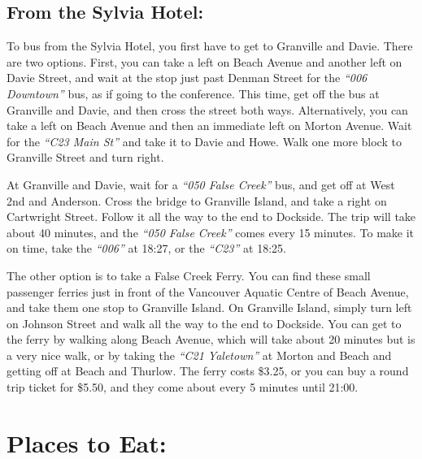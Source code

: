 \documentclass[letterpaper,12pt]{article}
\newcommand{\bus}[1]{\textit{``#1''}}
\begin{document}
\subsection*{From the Sylvia Hotel:}

To bus from the Sylvia Hotel, you first have to get to Granville and Davie. There are two options. First, you can take a left on Beach Avenue and another left on Davie Street, and wait at the stop just past Denman Street for the \bus{006 Downtown} bus, as if going to the conference. This time, get off the bus at Granville and Davie, and then cross the street both ways. Alternatively, you can take a left on Beach Avenue and then an immediate left on Morton Avenue. Wait for the \bus{C23 Main St} and take it to Davie and Howe. Walk one more block to Granville Street and turn right.

At Granville and Davie, wait for a \bus{050 False Creek} bus, and get off at West 2nd and Anderson. Cross the bridge to Granville Island, and take a right on Cartwright Street. Follow it all the way to the end to Dockside. The trip will take about 40 minutes, and the \bus{050 False Creek} comes every 15 minutes. To make it on time, take the \bus{006} at 18:27, or the \bus{C23} at 18:25.

The other option is to take a False Creek Ferry. You can find these small passenger ferries just in front of the Vancouver Aquatic Centre of Beach Avenue, and take them one stop to Granville Island. On Granville Island, simply turn left on Johnson Street and walk all the way to the end to Dockside. You can get to the ferry by walking along Beach Avenue, which will take about 20 minutes but is a very nice walk, or by taking the \bus{C21 Yaletown} at Morton and Beach and getting off at Beach and Thurlow. The ferry costs \$3.25, or you can buy a round trip ticket for \$5.50, and they come about every 5 minutes until 21:00.


\section*{Places to Eat:}
\end{document}
